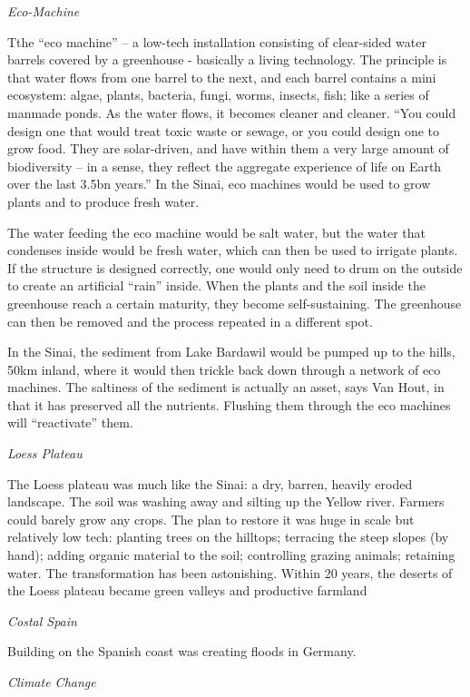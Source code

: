 \documentclass[
]{book}
\begin{document}
\emph{Eco-Machine}

Tthe ``eco machine'' -- a low-tech installation consisting of
clear-sided water barrels covered by a greenhouse
- basically a living technology.
The principle is that water flows from one barrel to the next, and each barrel contains a mini ecosystem: algae, plants, bacteria, fungi, worms, insects, fish; like a series of manmade ponds. As the water flows, it becomes cleaner and cleaner. ``You could design one that would treat toxic waste or sewage, or you could design one to grow food. They are solar-driven, and have within them a very large amount of biodiversity -- in a sense, they reflect the aggregate experience of life on Earth over the last 3.5bn years.'' In the Sinai, eco machines would be used to grow plants and to produce fresh water.

The water feeding the eco machine would be salt water, but the water that condenses inside would be fresh water, which can then be used to irrigate plants. If the structure is designed correctly, one would only need to drum on the outside to create an artificial ``rain'' inside. When the plants and the soil inside the greenhouse reach a certain maturity, they become self-sustaining. The greenhouse can then be removed and the process repeated in a different spot.

In the Sinai, the sediment from Lake Bardawil would be pumped up to the hills, 50km inland, where it would then trickle back down through a network of eco machines. The saltiness of the sediment is actually an asset, says Van Hout, in that it has preserved all the nutrients. Flushing them through the eco machines will ``reactivate'' them.

\emph{Loess Plateau}

The Loess plateau was much like the Sinai: a dry, barren, heavily eroded landscape. The soil was washing away and silting up the Yellow river. Farmers could barely grow any crops. The plan to restore it was huge in scale but relatively low tech: planting trees on the hilltops; terracing the steep slopes (by hand); adding organic material to the soil; controlling grazing animals; retaining water. The transformation has been astonishing. Within 20 years, the deserts of the Loess plateau became green valleys and productive farmland

\emph{Costal Spain}

Building on the Spanish coast was creating floods in Germany.

\emph{Climate Change}
\end{document}
